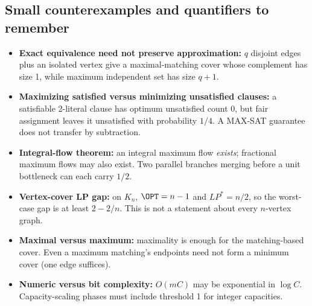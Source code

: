 \subsection{Small counterexamples and quantifiers to remember}
\begin{itemize}
\item \textbf{Exact equivalence need not preserve approximation:} $q$ disjoint edges plus
an isolated vertex give a maximal-matching cover whose complement has size 1, while
maximum independent set has size $q+1$.
\item \textbf{Maximizing satisfied versus minimizing unsatisfied clauses:} a satisfiable
2-literal clause has optimum unsatisfied count 0, but fair assignment leaves it unsatisfied
with probability $1/4$. A MAX-SAT guarantee does not transfer by subtraction.
\item \textbf{Integral-flow theorem:} an integral maximum flow \emph{exists}; fractional
maximum flows may also exist. Two parallel branches merging before a unit bottleneck can
each carry $1/2$.
\item \textbf{Vertex-cover LP gap:} on $K_n$, $\OPT=n-1$ and $LP^*=n/2$, so the
worst-case gap is at least $2-2/n$. This is not a statement about every $n$-vertex graph.
\item \textbf{Maximal versus maximum:} maximality is enough for the matching-based cover.
Even a maximum matching's endpoints need not form a minimum cover (one edge suffices).
\item \textbf{Numeric versus bit complexity:} $O(mC)$ may be exponential in $\log C$.
Capacity-scaling phases must include threshold 1 for integer capacities.
\end{itemize}

